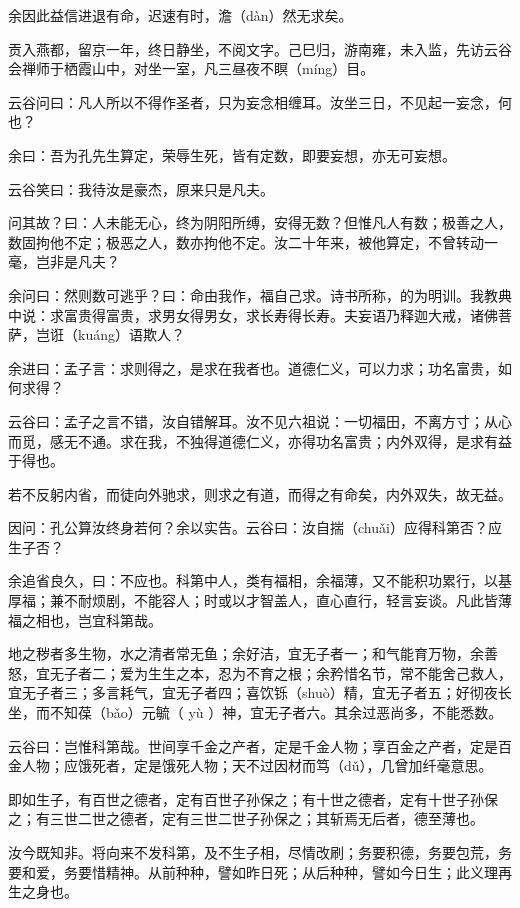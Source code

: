 \documentclass[12pt,UTF8]{ctexbook}
\begin{document}
余因此益信进退有命，迟速有时，澹（dàn）然无求矣。

贡入燕都，留京一年，终日静坐，不阅文字。己巳归，游南雍，未入监，先访云谷会禅师于栖霞山中，对坐一室，凡三昼夜不瞑（míng）目。

云谷问曰：凡人所以不得作圣者，只为妄念相缠耳。汝坐三日，不见起一妄念，何也？

余曰：吾为孔先生算定，荣辱生死，皆有定数，即要妄想，亦无可妄想。

云谷笑曰：我待汝是豪杰，原来只是凡夫。

问其故？曰：人未能无心，终为阴阳所缚，安得无数？但惟凡人有数；极善之人，数固拘他不定；极恶之人，数亦拘他不定。汝二十年来，被他算定，不曾转动一毫，岂非是凡夫？

余问曰：然则数可逃乎？曰：命由我作，福自己求。诗书所称，的为明训。我教典中说：求富贵得富贵，求男女得男女，求长寿得长寿。夫妄语乃释迦大戒，诸佛菩萨，岂诳（kuáng）语欺人？

余进曰：孟子言：求则得之，是求在我者也。道德仁义，可以力求；功名富贵，如何求得？

云谷曰：孟子之言不错，汝自错解耳。汝不见六祖说：一切福田，不离方寸；从心而觅，感无不通。求在我，不独得道德仁义，亦得功名富贵；内外双得，是求有益于得也。

若不反躬内省，而徒向外驰求，则求之有道，而得之有命矣，内外双失，故无益。

因问：孔公算汝终身若何？余以实告。云谷曰：汝自揣（chuǎi）应得科第否？应生子否？

余追省良久，曰：不应也。科第中人，类有福相，余福薄，又不能积功累行，以基厚福；兼不耐烦剧，不能容人；时或以才智盖人，直心直行，轻言妄谈。凡此皆薄福之相也，岂宜科第哉。

地之秽者多生物，水之清者常无鱼；余好洁，宜无子者一；和气能育万物，余善怒，宜无子者二；爱为生生之本，忍为不育之根；余矜惜名节，常不能舍己救人，宜无子者三；多言耗气，宜无子者四；喜饮铄（shuò）精，宜无子者五；好彻夜长坐，而不知葆（bǎo）元毓（ yù ）神，宜无子者六。其余过恶尚多，不能悉数。

云谷曰：岂惟科第哉。世间享千金之产者，定是千金人物；享百金之产者，定是百金人物；应饿死者，定是饿死人物；天不过因材而笃（dǔ），几曾加纤毫意思。

即如生子，有百世之德者，定有百世子孙保之；有十世之德者，定有十世子孙保之；有三世二世之德者，定有三世二世子孙保之；其斩焉无后者，德至薄也。

汝今既知非。将向来不发科第，及不生子相，尽情改刷；务要积德，务要包荒，务要和爱，务要惜精神。从前种种，譬如昨日死；从后种种，譬如今日生；此义理再生之身也。
\end{document}
